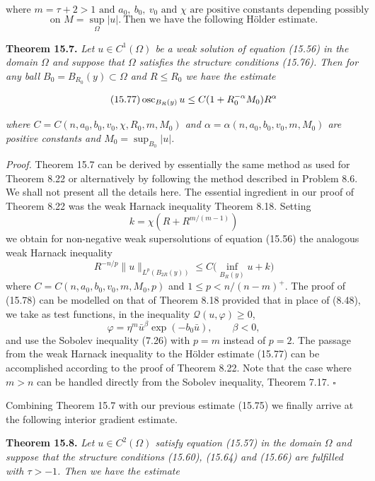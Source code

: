 \[
\text{where } m=\tau+2>1 \text{ and } a_0,\ b_0,\ v_0 \text{ and } \chi \text{ are positive constants depending possibly}
\]
\[
\text{on } M=\sup_{\Omega}|u|.\ \text{Then we have the following Hölder estimate.}
\]

\textbf{Theorem 15.7.} \emph{Let $u\in C^1(\Omega)$ be a weak solution of equation (15.56) in the domain
$\Omega$ and suppose that $\Omega$ satisfies the structure conditions (15.76). Then for any ball
$B_0=B_{R_0}(y)\subset\Omega$ and $R\leq R_0$ we have the estimate}

\begin{equation}
\tag{15.77}
\operatorname{osc}_{B_R(y)} u \leq C(1+R_0^{-\alpha}M_0)R^\alpha
\end{equation}

\emph{where $C=C(n,a_0,b_0,v_0,\chi,R_0,m,M_0)$ and $\alpha=\alpha(n,a_0,b_0,v_0,m,M_0)$ are positive
constants and $M_0=\sup_{B_0}|u|$.}

\textit{Proof.} Theorem 15.7 can be derived by essentially the same method as used for
Theorem 8.22 or alternatively by following the method described in Problem 8.6.
We shall not present all the details here. The essential ingredient in our proof of
Theorem 8.22 was the weak Harnack inequality Theorem 8.18. Setting
\[
k=\chi(R+R^{m/(m-1)})
\]
we obtain for non-negative weak supersolutions of equation (15.56) the analogous
weak Harnack inequality
\begin{equation}
\tag{15.78}
R^{-n/p}\|u\|_{L^p(B_{2R}(y))}\leq C\bigl(\inf_{B_R(y)} u+k\bigr)
\end{equation}
where $C=C(n,a_0,b_0,v_0,m,M_0,p)$ and $1\leq p<n/(n-m)^+$. The proof of (15.78)
can be modelled on that of Theorem 8.18 provided that in place of (8.48), we take
as test functions, in the inequality $\mathcal{Q}(u,\varphi)\geq 0$,
\[
\varphi=\eta^m \bar{u}^{\beta} \exp(-b_0\bar{u}), \qquad \beta<0,
\]
and use the Sobolev inequality (7.26) with $p=m$ instead of $p=2$. The passage
from the weak Harnack inequality to the Hölder estimate (15.77) can be accomplished
according to the proof of Theorem 8.22. Note that the case where $m>n$
can be handled directly from the Sobolev inequality, Theorem 7.17. \hfill$\square$

Combining Theorem 15.7 with our previous estimate (15.75) we finally arrive
at the following interior gradient estimate.

\textbf{Theorem 15.8.} \emph{Let $u\in C^2(\Omega)$ satisfy equation (15.57) in the domain $\Omega$ and suppose
that the structure conditions (15.60), (15.64) and (15.66) are fulfilled with $\tau>-1$.
Then we have the estimate}

